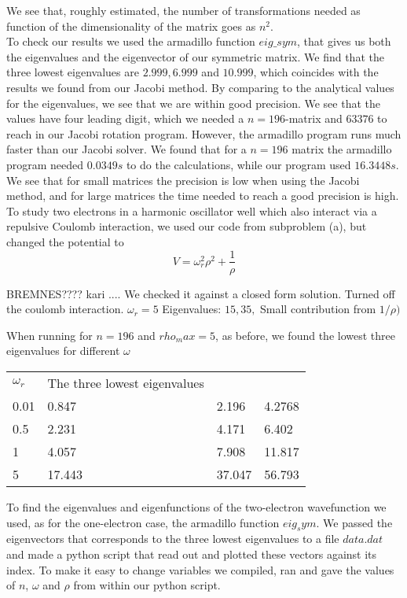 \documentclass[a4paper,12pt, english]{article}
\begin{document}
We see that, roughly estimated, the number of transformations needed as function of the dimensionality of the matrix goes as $n^2$. \\


To check our results we used the armadillo function $eig\_sym$, that gives us both the eigenvalues and the eigenvector of our symmetric matrix. We find that the three lowest eigenvalues are $2.999, 6.999$ and $10.999$, which coincides with the results we found from our Jacobi method. By comparing to the analytical values for the eigenvalues, we see that we are within good precision. We see that the values have four leading digit, which we needed a $n=196$-matrix and $63376$ to reach in our Jacobi rotation program. However, the armadillo program runs much faster than our Jacobi solver. We found that for a $n=196$ matrix the armadillo program needed $0.0349 s$ to do the calculations, while our program used $16.3448 s$. We see that for small matrices the precision is low when using the Jacobi method, and for large matrices the time needed to reach a good precision is high. \\


To study two electrons in a harmonic oscillator well which also interact via a repulsive Coulomb interaction, we used our code from subproblem (a), but changed the potential to $$V = \omega_r^2 \rho^2 + \frac{1}{\rho} $$

BREMNES???? kari ....
We checked it against a closed form solution. Turned off the coulomb interaction. $\omega_r = 5$
Eigenvalues: $15, 35, $
Small contribution from $ 1/ \rho)$


When running for $n=196$ and $rho_max = 5$, as before, we found the lowest three eigenvalues for different $\omega$

 
\begin{center}
\begin{tabular}{l |  l l l}
$\omega_r$ & The three lowest eigenvalues \\
0.01 & 0.847 & 2.196 & 4.2768   \\
0.5 & 2.231 & 4.171 & 6.402 \\
1 & 4.057 & 7.908 & 11.817\\
5 & 17.443 & 37.047 & 56.793
\end{tabular}
\end{center}




To find the eigenvalues and eigenfunctions of the two-electron wavefunction we used, as for the one-electron case, the armadillo function $eig_sym$. We passed the eigenvectors that corresponds to the three lowest eigenvalues to a file $data.dat$ and made a python script that read out and plotted these vectors against its index. To make it easy to change variables we compiled, ran and gave the values of $n$, $\omega$ and $\rho$ from within our python script.    
\end{document}
